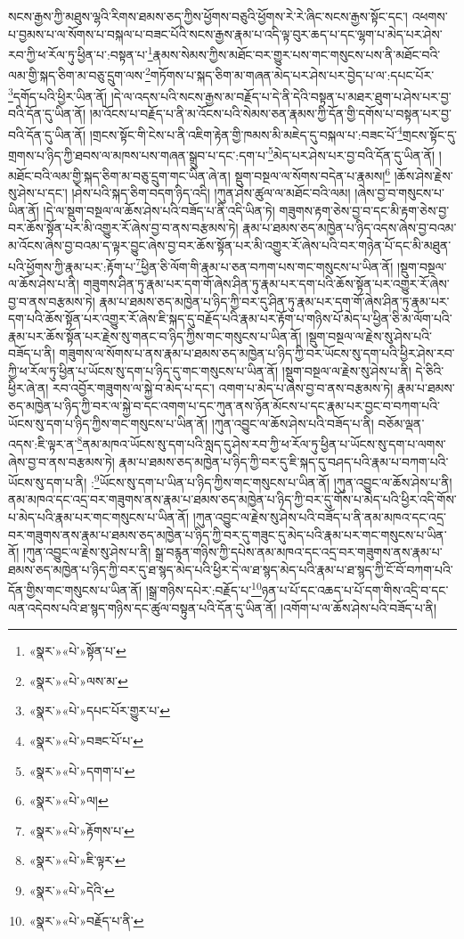 སངས་རྒྱས་ཀྱི་མཐུས་ལྷའི་རིགས་ཐམས་ཅད་ཀྱིས་ཕྱོགས་བཅུའི་ཕྱོགས་རེ་རེ་ཞིང་སངས་རྒྱས་སྟོང་དང་། འཕགས་པ་བྱམས་པ་ལ་སོགས་པ་བསྐལ་པ་བཟང་པོའི་སངས་རྒྱས་རྣམ་པ་འདི་ལྟ་བུར་ཆད་པ་དང་ལྷག་པ་མེད་པར་ཤེས་རབ་ཀྱི་ཕ་རོལ་ཏུ་ཕྱིན་པ་:བསྟན་པ་\footnote{«སྣར་»«པེ་»སྟོན་པ་}རྣམས་སེམས་ཀྱིས་མཐོང་བར་གྱུར་པས་གང་གསུངས་པས་ནི་མཐོང་བའི་ལམ་གྱི་སྐད་ཅིག་མ་བཅུ་དྲུག་ལས་\footnote{«སྣར་»«པེ་»ལས་མ་}གཏོགས་པ་སྐད་ཅིག་མ་གཞན་མེད་པར་ཤེས་པར་བྱེད་པ་ལ་:དཔང་པོར་\footnote{«སྣར་»«པེ་»དཔང་པོར་གྱུར་པ་}དགོད་པའི་ཕྱིར་ཡིན་ནོ། །དེ་ལ་འདས་པའི་སངས་རྒྱས་མ་བརྗོད་པ་དེ་ནི་དེའི་བསྟན་པ་མཐར་ཐུག་པ་ཤེས་པར་བྱ་བའི་དོན་དུ་ཡིན་ནོ། །མ་འོངས་པ་བརྗོད་པ་ནི་མ་འོངས་པའི་སེམས་ཅན་རྣམས་ཀྱི་དོན་གྱི་དགོས་པ་བསྟན་པར་བྱ་བའི་དོན་དུ་ཡིན་ནོ། །གྲངས་སྟོང་གི་ངེས་པ་ནི་འཇིག་རྟེན་གྱི་ཁམས་མི་མཇེད་དུ་བསྐལ་པ་:བཟང་པོ་\footnote{«སྣར་»«པེ་»བཟང་པོ་པ་}གྲངས་སྟོང་དུ་གྲགས་པ་ཉིད་ཀྱི་ཐབས་ལ་མཁས་པས་གཞན་སྒྲུབ་པ་དང་:དག་པ་\footnote{«སྣར་»«པེ་»དགག་པ་}མེད་པར་ཤེས་པར་བྱ་བའི་དོན་དུ་ཡིན་ནོ། །མཐོང་བའི་ལམ་གྱི་སྐད་ཅིག་མ་བཅུ་དྲུག་གང་ཡིན་ཞེ་ན། སྡུག་བསྔལ་ལ་སོགས་བདེན་པ་རྣམས།\footnote{«སྣར་»«པེ་»ལ།} །ཆོས་ཤེས་རྗེས་སུ་ཤེས་པ་དང་། །ཤེས་པའི་སྐད་ཅིག་བདག་ཉིད་འདི། །ཀུན་ཤེས་ཚུལ་ལ་མཐོང་བའི་ལམ། །ཞེས་བྱ་བ་གསུངས་པ་ཡིན་ནོ། །དེ་ལ་སྡུག་བསྔལ་ལ་ཆོས་ཤེས་པའི་བཟོད་པ་ནི་འདི་ཡིན་ཏེ། གཟུགས་རྟག་ཅེས་བྱ་བ་དང་མི་རྟག་ཅེས་བྱ་བར་ཆོས་སྟོན་པར་མི་འགྱུར་རོ་ཞེས་བྱ་བ་ནས་བརྩམས་ཏེ། རྣམ་པ་ཐམས་ཅད་མཁྱེན་པ་ཉིད་འདས་ཞེས་བྱ་བའམ་མ་འོངས་ཞེས་བྱ་བའམ་ད་ལྟར་བྱུང་ཞེས་བྱ་བར་ཆོས་སྟོན་པར་མི་འགྱུར་རོ་ཞེས་པའི་བར་གཉེན་པོ་དང་མི་མཐུན་པའི་ཕྱོགས་ཀྱི་རྣམ་པར་:རྟོག་པ་\footnote{«སྣར་»«པེ་»རྟོགས་པ་}ཕྱིན་ཅི་ལོག་གི་རྣམ་པ་ཅན་བཀག་པས་གང་གསུངས་པ་ཡིན་ནོ། །སྡུག་བསྔལ་ལ་ཆོས་ཤེས་པ་ནི། གཟུགས་ཤིན་ཏུ་རྣམ་པར་དག་གོ་ཞེས་ཤིན་ཏུ་རྣམ་པར་དག་པའི་ཆོས་སྟོན་པར་འགྱུར་རོ་ཞེས་བྱ་བ་ནས་བརྩམས་ཏེ། རྣམ་པ་ཐམས་ཅད་མཁྱེན་པ་ཉིད་ཀྱི་བར་དུ་ཤིན་ཏུ་རྣམ་པར་དག་གོ་ཞེས་ཤིན་ཏུ་རྣམ་པར་དག་པའི་ཆོས་སྟོན་པར་འགྱུར་རོ་ཞེས་ཇི་སྐད་དུ་བརྗོད་པའི་རྣམ་པར་རྟོག་པ་གཉིས་པོ་མེད་པ་ཕྱིན་ཅི་མ་ལོག་པའི་རྣམ་པར་ཆོས་སྟོན་པར་རྗེས་སུ་གནང་བ་ཉིད་ཀྱིས་གང་གསུངས་པ་ཡིན་ནོ། །སྡུག་བསྔལ་ལ་རྗེས་སུ་ཤེས་པའི་བཟོད་པ་ནི། གཟུགས་ལ་སོགས་པ་ནས་རྣམ་པ་ཐམས་ཅད་མཁྱེན་པ་ཉིད་ཀྱི་བར་ཡོངས་སུ་དག་པའི་ཕྱིར་ཤེས་རབ་ཀྱི་ཕ་རོལ་ཏུ་ཕྱིན་པ་ཡོངས་སུ་དག་པ་ཉིད་དུ་གང་གསུངས་པ་ཡིན་ནོ། །སྡུག་བསྔལ་ལ་རྗེས་སུ་ཤེས་པ་ནི། དེ་ཅིའི་ཕྱིར་ཞེ་ན། རབ་འབྱོར་གཟུགས་ལ་སྐྱེ་བ་མེད་པ་དང་། འགག་པ་མེད་པ་ཞེས་བྱ་བ་ནས་བརྩམས་ཏེ། རྣམ་པ་ཐམས་ཅད་མཁྱེན་པ་ཉིད་ཀྱི་བར་ལ་སྐྱེ་བ་དང་འགག་པ་དང་ཀུན་ནས་ཉོན་མོངས་པ་དང་རྣམ་པར་བྱང་བ་བཀག་པའི་ཡོངས་སུ་དག་པ་ཉིད་ཀྱིས་གང་གསུངས་པ་ཡིན་ནོ། །ཀུན་འབྱུང་ལ་ཆོས་ཤེས་པའི་བཟོད་པ་ནི། བཅོམ་ལྡན་འདས་:ཇི་ལྟར་ན་\footnote{«སྣར་»«པེ་»ཇི་ལྟར་}ནམ་མཁའ་ཡོངས་སུ་དག་པའི་སླད་དུ་ཤེས་རབ་ཀྱི་ཕ་རོལ་ཏུ་ཕྱིན་པ་ཡོངས་སུ་དག་པ་ལགས་ཞེས་བྱ་བ་ནས་བརྩམས་ཏེ། རྣམ་པ་ཐམས་ཅད་མཁྱེན་པ་ཉིད་ཀྱི་བར་དུ་ཇི་སྐད་དུ་བཤད་པའི་རྣམ་པ་བཀག་པའི་ཡོངས་སུ་དག་པ་ནི། :\footnote{«སྣར་»«པེ་»དེའི་}ཡོངས་སུ་དག་པ་ཡིན་པ་ཉིད་ཀྱིས་གང་གསུངས་པ་ཡིན་ནོ། །ཀུན་འབྱུང་ལ་ཆོས་ཤེས་པ་ནི། ནམ་མཁའ་དང་འདྲ་བར་གཟུགས་ནས་རྣམ་པ་ཐམས་ཅད་མཁྱེན་པ་ཉིད་ཀྱི་བར་དུ་གོས་པ་མེད་པའི་ཕྱིར་འདི་གོས་པ་མེད་པའི་རྣམ་པར་གང་གསུངས་པ་ཡིན་ནོ། །ཀུན་འབྱུང་ལ་རྗེས་སུ་ཤེས་པའི་བཟོད་པ་ནི་ནམ་མཁའ་དང་འདྲ་བར་གཟུགས་ནས་རྣམ་པ་ཐམས་ཅད་མཁྱེན་པ་ཉིད་ཀྱི་བར་དུ་གཟུང་དུ་མེད་པའི་རྣམ་པར་གང་གསུངས་པ་ཡིན་ནོ། །ཀུན་འབྱུང་ལ་རྗེས་སུ་ཤེས་པ་ནི། སྒྲ་བརྙན་གཉིས་ཀྱི་དཔེས་ནམ་མཁའ་དང་འདྲ་བར་གཟུགས་ནས་རྣམ་པ་ཐམས་ཅད་མཁྱེན་པ་ཉིད་ཀྱི་བར་དུ་ཐ་སྙད་མེད་པའི་ཕྱིར་དེ་ལ་ཐ་སྙད་མེད་པའི་རྣམ་པ་ཐ་སྙད་ཀྱི་ངོ་བོ་བཀག་པའི་དོན་གྱིས་གང་གསུངས་པ་ཡིན་ནོ། །སྒྲ་གཉིས་དཔེར་:བརྗོད་པ་\footnote{«སྣར་»«པེ་»བརྗོད་པ་ནི་}ཉན་པ་པོ་དང་འཆད་པ་པོ་དག་གིས་འདྲི་བ་དང་ལན་འདེབས་པའི་ཐ་སྙད་གཉིས་དང་ཚུལ་བསྟུན་པའི་དོན་དུ་ཡིན་ནོ། །འགོག་པ་ལ་ཆོས་ཤེས་པའི་བཟོད་པ་ནི། 